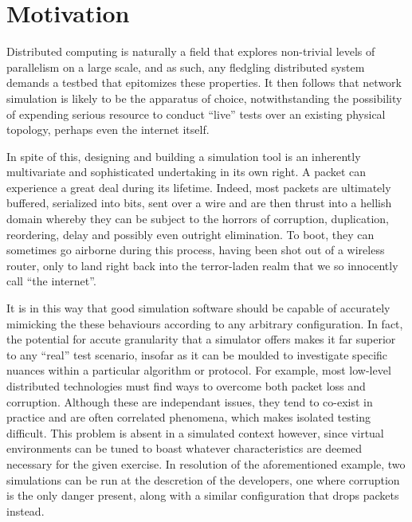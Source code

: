 \section{Motivation}

Distributed computing is naturally a field that explores non-trivial levels of parallelism on a large scale, and as
such, any fledgling distributed system demands a testbed that epitomizes these properties. It then follows that
network simulation is likely to be the apparatus of choice, notwithstanding the possibility of expending serious
resource to conduct ``live'' tests over an existing physical topology, perhaps even the internet itself.

In spite of this, designing and building a simulation tool is an inherently multivariate and sophisticated undertaking
in its own right. A packet can experience a great deal during its lifetime. Indeed, most packets are ultimately
buffered, serialized into bits, sent over a wire and are then thrust into a hellish domain whereby they can be
subject to the horrors of corruption, duplication, reordering, delay and possibly even outright elimination. To boot,
they can sometimes go airborne during this process, having been shot out of a wireless router, only to land right
back into the terror-laden realm that we so innocently call ``the internet''.

It is in this way that good simulation software should be capable of accurately mimicking the these behaviours
according to any arbitrary configuration. In fact, the potential for accute granularity that a simulator offers makes
it far superior to any ``real'' test scenario, insofar as it can be moulded to investigate specific nuances within a
particular algorithm or protocol. For example, most low-level distributed technologies must find ways to overcome
both packet loss and corruption. Although these are independant issues, they tend to co-exist in practice and are
often correlated phenomena, which makes isolated testing difficult. This problem is absent in a simulated context
however, since virtual environments can be tuned to boast whatever characteristics are deemed necessary for
the given exercise. In resolution of the aforementioned example, two simulations can be run at the descretion of the
developers, one where corruption is the only danger present, along with a similar configuration that drops packets
instead.

